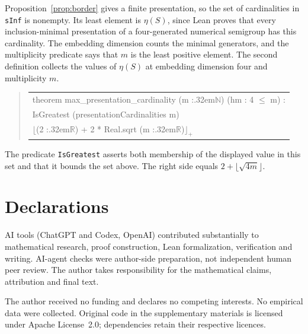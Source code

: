\documentclass[11pt]{article}
\theoremstyle{definition}
\theoremstyle{remark}
\theoremstyle{plain}
\begin{document}
Proposition~\ref{prop:border} gives a finite presentation, so the set
of cardinalities in \texttt{sInf} is nonempty. Its least element is
$\eta(S)$, since Lean proves that every inclusion-minimal presentation
of a four-generated numerical semigroup has this cardinality.
The embedding dimension counts the minimal generators, and the
multiplicity predicate says that $m$ is the least positive element.
The second definition collects the values of $\eta(S)$ at embedding
dimension four and multiplicity $m$.

\begin{quote}\small\ttfamily
\begin{tabular}{@{}l@{}}
\hspace*{0em}theorem max\_presentation\_cardinality (m :\kern.32em\(\mathbb N\)) (hm : 4 \(\le\) m) :\\
\hspace*{2em}IsGreatest (presentationCardinalities m)\\
\hspace*{3em}\(\lfloor\)(2 :\kern.32em\(\mathbb R\)) + 2 * Real.sqrt (m :\kern.32em\(\mathbb R\))\(\rfloor_+\)
\end{tabular}
\end{quote}

The predicate \texttt{IsGreatest} asserts both membership of the displayed
value in this set and that it bounds the set above. The right side equals
$2+\lfloor\sqrt{4m}\rfloor$.

\section*{Declarations}
AI tools (ChatGPT and Codex, OpenAI) contributed substantially to
mathematical research, proof construction, Lean formalization,
verification and writing. AI-agent checks were author-side preparation,
not independent human peer review. The author takes responsibility for the mathematical claims, attribution
and final text.

The author received no funding and declares no competing interests.
No empirical data were collected. Original code in the supplementary
materials is licensed under Apache License~2.0; dependencies retain
their respective licences.
\end{document}
